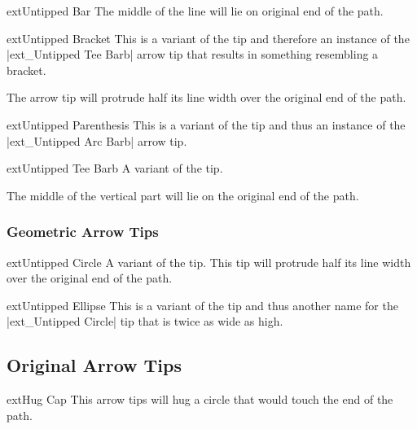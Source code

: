 \begin{multicols}{2}
\begin{arrowtipsimple}{ext\textunderscore Untipped Bar}
    The middle of the line will lie on original end of the path.
\end{arrowtipsimple}

\begin{arrowtipsimple}{ext\textunderscore Untipped Bracket}\tipcompat
    This is a variant of the  tip and
    therefore an instance of the |ext_Untipped Tee Barb| arrow tip that results in something
    resembling a bracket.
    
    The arrow tip will protrude half its line width over the original end of the path.
\end{arrowtipsimple}

\begin{arrowtipsimple}{ext\textunderscore Untipped Parenthesis}\tipcompat
    This is a variant of the  tip and
    thus an instance of the |ext_Untipped Arc Barb| arrow tip.
\end{arrowtipsimple}

\begin{arrowtipsimple}{ext\textunderscore Untipped Tee Barb}\tipcompat
    A variant of the  tip.
    
    The middle of the vertical part will lie on the original end of the path.
\end{arrowtipsimple}

\subsubsection{Geometric Arrow Tips}
\begin{arrowtipsimple}{ext\textunderscore Untipped Circle}\tipcompat
    A variant of the  tip.
    This tip will protrude half its line width over the original end of the path.
\end{arrowtipsimple}

\begin{arrowtipsimple}{ext\textunderscore Untipped Ellipse}\tipcompat
    This is a variant of the  tip
    and thus another name for the |ext_Untipped Circle| tip
    that is twice as wide as high.
\end{arrowtipsimple}

\newcolumn
\subsection{Original Arrow Tips}
\begin{arrowtipsimple}{ext\textunderscore Hug Cap}\tipcompat
This arrow tips will hug a circle that would touch the end of the path.


\end{arrowtipsimple}
\end{multicols}
